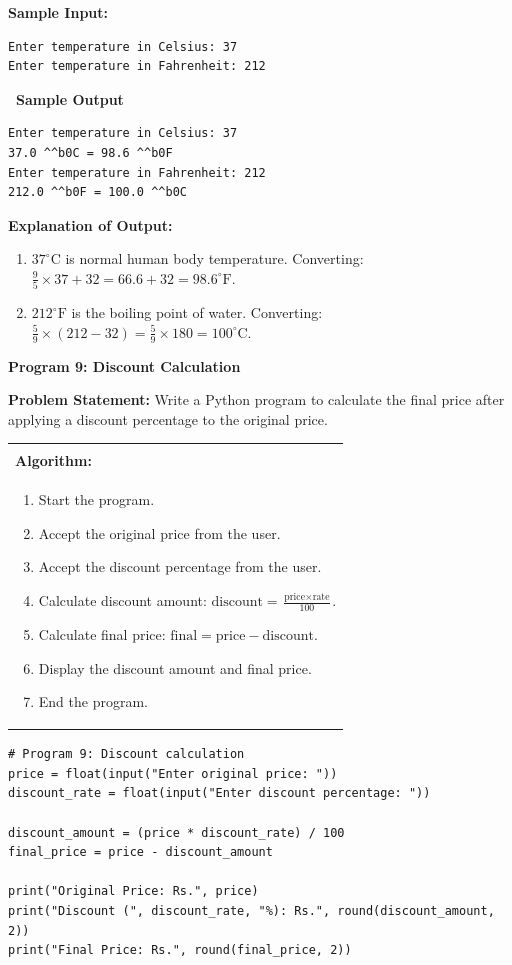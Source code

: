 \documentclass[12pt,a4paper]{article}
\makeatletter
\newcommand{\outhead}{\noindent\colorbox{cmrgreen!25}%
  {\textbf{\small\color{cmrdark}~Sample Output~}}\par\vspace{-1pt}}
\newenvironment{algobox}{%
  \par\vspace{4pt}%
  \noindent\begin{tabular}{@{}p{\linewidth}@{}}%
  \hline\\[-8pt]%
  \textbf{\color{blue!60!black}\small Algorithm:}\\[2pt]%
}{%
  \\[-4pt]\hline%
  \end{tabular}\par\vspace{4pt}%
}
\makeatother
\begin{document}
\textbf{Sample Input:}
\begin{verbatim}
Enter temperature in Celsius: 37
Enter temperature in Fahrenheit: 212
\end{verbatim}

\outhead
\begin{lstlisting}[style=outputstyle]
Enter temperature in Celsius: 37
37.0 ^^b0C = 98.6 ^^b0F
Enter temperature in Fahrenheit: 212
212.0 ^^b0F = 100.0 ^^b0C
\end{lstlisting}

\textbf{Explanation of Output:}
\begin{enumerate}
  \item $37^\circ\mathrm{C}$ is normal human body temperature. Converting: $\frac{9}{5} \times 37 + 32 = 66.6 + 32 = 98.6^\circ\mathrm{F}$.
  \item $212^\circ\mathrm{F}$ is the boiling point of water. Converting: $\frac{5}{9} \times (212 - 32) = \frac{5}{9} \times 180 = 100^\circ\mathrm{C}$.
\end{enumerate}

\vspace{0.5cm}

\textbf{Program 9: Discount Calculation}

\textbf{Problem Statement:}
Write a Python program to calculate the final price after applying a discount percentage to the original price.

\begin{algobox}
\begin{enumerate}[label=Step \arabic*:]
  \item Start the program.
  \item Accept the original price from the user.
  \item Accept the discount percentage from the user.
  \item Calculate discount amount: $\text{discount} = \frac{\text{price} \times \text{rate}}{100}$.
  \item Calculate final price: $\text{final} = \text{price} - \text{discount}$.
  \item Display the discount amount and final price.
  \item End the program.
\end{enumerate}
\end{algobox}

\begin{lstlisting}
# Program 9: Discount calculation
price = float(input("Enter original price: "))
discount_rate = float(input("Enter discount percentage: "))

discount_amount = (price * discount_rate) / 100
final_price = price - discount_amount

print("Original Price: Rs.", price)
print("Discount (", discount_rate, "%): Rs.", round(discount_amount, 2))
print("Final Price: Rs.", round(final_price, 2))
\end{lstlisting}
\end{document}
